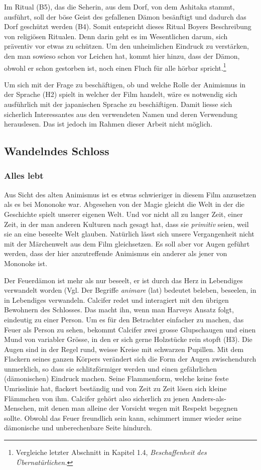 Im Ritual (B5), das die Seherin, aus dem Dorf, von dem Ashitaka stammt, ausführt, soll der böse Geist des gefallenen Dämon besänftigt und dadurch das Dorf geschützt werden (B4). Somit entspricht dieses Ritual Boyers Beschreibung von religiösen Ritualen. Denn darin geht es im Wesentlichen darum, sich präventiv vor etwas zu schützen. Um den unheimlichen Eindruck zu verstärken, den man sowieso schon vor Leichen hat, kommt hier hinzu, dass der Dämon, obwohl er schon gestorben ist, noch einen Fluch für alle hörbar spricht.\footnote{Vergleiche letzter Abschnitt in Kapitel 1.4, \emph{Beschaffenheit des Übernatürlichen.}}

Um sich mit der Frage zu beschäftigen, ob und welche Rolle der Animismus in der Sprache (H2) spielt in welcher der Film handelt, wäre es notwendig sich ausführlich mit der japanischen Sprache zu beschäftigen. Damit liesse sich sicherlich Interessantes aus den verwendeten Namen und deren Verwendung herauslesen. Das ist jedoch im Rahmen dieser Arbeit nicht möglich. 

\subsection{Wandelndes Schloss} 
\subsubsection{Alles lebt} 
Aus Sicht des alten Animismus ist es etwas schwieriger in diesem Film anzusetzen als es bei Mononoke war. Abgesehen von der Magie gleicht die Welt in der die Geschichte spielt unserer eigenen Welt. Und vor nicht all zu langer Zeit, einer Zeit, in der man anderen Kulturen nach gesagt hat, dass sie \emph{primitiv} seien, weil sie an eine beseelte Welt glauben. Natürlich lässt sich unsere Vergangenheit nicht mit der Märchenwelt aus dem Film gleichsetzen. Es soll aber vor Augen geführt werden, dass der hier anzutreffende Animismus ein anderer als jener von Mononoke ist. 

Der Feuerdämon ist mehr als nur beseelt, er ist durch das Herz in Lebendiges verwandelt worden (Vgl. Der Begriffe \emph{animare} (lat) bedeutet beleben, beseelen, in in Lebendiges verwandeln. Calcifer redet und interagiert mit den übrigen Bewohnern des Schlosses. Das macht ihn, wenn man Harveys Ansatz folgt, eindeutig zu einer Person. Um es für den Betrachter einfacher zu machen, das Feuer als Person zu sehen, bekommt Calcifer zwei grosse Glupschaugen und einen Mund von variabler Grösse, in den er sich gerne Holzstücke rein stopft (H3). Die Augen sind in der Regel rund, weisse Kreise mit schwarzen Pupillen. Mit dem Flackern seines ganzen Körpers verändert sich die Form der Augen zwischendurch unmerklich, so dass sie schlitzförmiger werden und einen gefährlichen (dämonischen) Eindruck machen. Seine Flammenform, welche keine feste Umrisslinie hat, flackert beständig und von Zeit zu Zeit lösen sich kleine Flämmchen von ihm. Calcifer gehört also sicherlich zu jenen Anders-als-Menschen, mit denen man alleine der Vorsicht wegen mit Respekt begegnen sollte. Obwohl das Feuer freundlich sein kann, schimmert immer wieder seine dämonische und unberechenbare Seite hindurch. 

